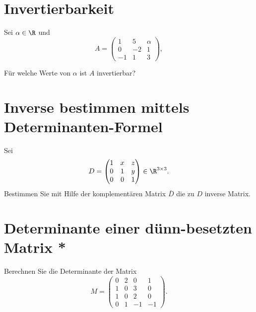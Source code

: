 \section{Invertierbarkeit}

Sei $\alpha \in \R$ und
$$
	A =
	\begin{pmatrix}
		1	&5	&\alpha	\\
		0	&-2	&1	\\
		-1	&1	&3
	\end{pmatrix},
$$

F\"ur welche Werte von $\alpha$ ist $A$ invertierbar?


\section{Inverse bestimmen mittels Determinanten-Formel}

Sei 
$$
	D = 
	\begin{pmatrix}
		1	& x	&z\\
		0	&1&y\\		
		0	&0	&1
	\end{pmatrix}
	\in \R^{3\times 3}.
$$
Bestimmen Sie mit Hilfe der komplementären Matrix $\bar D$ die zu $D$ inverse Matrix.


\section{Determinante einer dünn-besetzten Matrix *}
Berechnen Sie die Determinante der Matrix
$$
	M=\begin{pmatrix}
		0	& 2	&  0& 1	\\
		1	& 0	&  3	& 0	\\
		1	& 0	&  2	& 0\\
		0	& 1	&  -1	& -1	
	\end{pmatrix}.
$$




